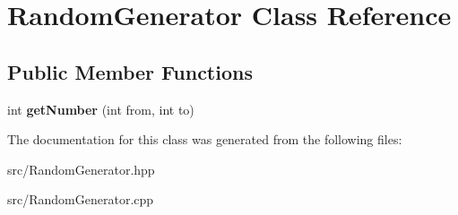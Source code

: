\hypertarget{class_random_generator}{}\section{Random\+Generator Class Reference}
\label{class_random_generator}
\subsection*{Public Member Functions}
\begin{DoxyCompactItemize}
\item 
\mbox{\label{class_random_generator_a77913071c97c0904ffda94b2d815e6f5}} 
int {\bfseries get\+Number} (int from, int to)
\end{DoxyCompactItemize}


The documentation for this class was generated from the following files\+:\begin{DoxyCompactItemize}
\item 
src/Random\+Generator.\+hpp\item 
src/Random\+Generator.\+cpp\end{DoxyCompactItemize}
